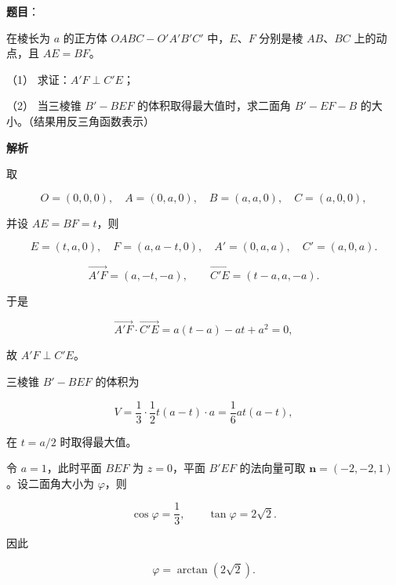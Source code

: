 \begin{answer}

\textbf{题目}：

在棱长为 $a$ 的正方体 $OABC-O'A'B'C'$ 中，$E\text{、}F$ 分别是棱 $AB\text{、}BC$ 上的动点，且 $AE=BF$。
\nopagebreak[4]
\begin{center}\end{center}
\nopagebreak[4]
（1） 求证：$A'F\perp C'E$；

（2） 当三棱锥 $B'-BEF$ 的体积取得最大值时，求二面角 $B'-EF-B$ 的大小。（结果用反三角函数表示）

\textbf{解析}

取

\nopagebreak[4]
\[
O=(0,0,0),\quad A=(0,a,0),\quad B=(a,a,0),\quad C=(a,0,0),
\]

并设 $AE=BF=t$，则

\nopagebreak[4]
\[
E=(t,a,0),\quad F=(a,a-t,0),\quad
A'=(0,a,a),\quad C'=(a,0,a).
\]


\nopagebreak[4]
\[
\overrightarrow{A'F}=(a,-t,-a),\qquad
\overrightarrow{C'E}=(t-a,a,-a).
\]

于是

\nopagebreak[4]
\[
\overrightarrow{A'F}\cdot\overrightarrow{C'E}
=a(t-a)-at+a^2=0,
\]

故 $A'F\perp C'E$。


三棱锥 $B'-BEF$ 的体积为

\nopagebreak[4]
\[
V=\frac13\cdot\frac12t(a-t)\cdot a
=\frac16at(a-t),
\]

在 $t=a/2$ 时取得最大值。

令 $a=1$，此时平面 $BEF$ 为 $z=0$，平面 $B'EF$ 的法向量可取 $\boldsymbol n=(-2,-2,1)$。设二面角大小为 $\varphi$，则

\nopagebreak[4]
\[
\cos\varphi=\frac13,\qquad \tan\varphi=2\sqrt2.
\]

因此

\nopagebreak[4]
\[
\varphi=\arctan(2\sqrt2).
\]



\end{answer}
